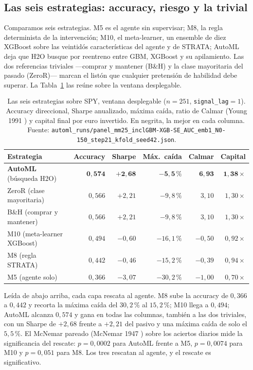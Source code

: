 \subsection{Las seis estrategias: accuracy, riesgo y la trivial}
\label{sec:mp-spy-estrategias}

Comparamos seis estrategias. M5 es el agente sin supervisar; M8, la regla determinista de la intervención; M10, el meta-learner, un ensemble de diez XGBoost sobre las veintidós características del agente y de STRATA; AutoML deja que H2O busque por reentreno entre GBM, XGBoost y su apilamiento. Las dos referencias triviales —comprar y mantener (B\&H) y la clase mayoritaria del pasado (ZeroR)— marcan el listón que cualquier pretensión de habilidad debe superar. La Tabla~\ref{tab:mp-spy} las reúne sobre la ventana desplegable.

\begin{table}[htbp]
\centering
\caption{Las seis estrategias sobre SPY, ventana desplegable ($n = 251$, \texttt{signal\_lag}${}=1$). Accuracy direccional, Sharpe anualizado, máxima caída, ratio de Calmar (Young 1991 \cite{young1991}) y capital final por euro invertido. En negrita, la mejor en cada columna. Fuente: \texttt{automl\_runs/panel\_mm25\_inclGBM-XGB-SE\_AUC\_emb1\_N0-150\_step21\_kfold\_seed42.json}.}
\label{tab:mp-spy}
\begin{tabular}{lrrrrr}
\toprule
Estrategia & Accuracy & Sharpe & Máx.\ caída & Calmar & Capital \\
\midrule
\textbf{AutoML} (búsqueda H2O) & $\mathbf{0{,}574}$ & $\mathbf{+2{,}68}$ & $\mathbf{-5{,}5\,\%}$ & $\mathbf{6{,}93}$ & $\mathbf{1{,}38\times}$ \\
ZeroR (clase mayoritaria) & $0{,}566$ & $+2{,}21$ & $-9{,}8\,\%$ & $3{,}10$ & $1{,}30\times$ \\
B\&H (comprar y mantener) & $0{,}566$ & $+2{,}21$ & $-9{,}8\,\%$ & $3{,}10$ & $1{,}30\times$ \\
M10 (meta-learner XGBoost) & $0{,}494$ & $-0{,}60$ & $-16{,}1\,\%$ & $-0{,}50$ & $0{,}92\times$ \\
M8 (regla STRATA) & $0{,}442$ & $-0{,}46$ & $-15{,}2\,\%$ & $-0{,}39$ & $0{,}94\times$ \\
M5 (agente solo) & $0{,}366$ & $-3{,}07$ & $-30{,}2\,\%$ & $-1{,}00$ & $0{,}70\times$ \\
\bottomrule
\end{tabular}
\end{table}

Leída de abajo arriba, cada capa rescata al agente. M8 sube la accuracy de $0{,}366$ a $0{,}442$ y recorta la máxima caída del $30{,}2\,\%$ al $15{,}2\,\%$; M10 llega a $0{,}494$; AutoML alcanza $0{,}574$ y gana en todas las columnas, también a las dos triviales, con un Sharpe de $+2{,}68$ frente a $+2{,}21$ del pasivo y una máxima caída de solo el $5{,}5\,\%$. El McNemar pareado (McNemar 1947 \cite{mcnemar1947}) sobre los aciertos diarios mide la significancia del rescate: $p = 0{,}0002$ para AutoML frente a M5, $p = 0{,}0074$ para M10 y $p = 0{,}051$ para M8. Los tres rescatan al agente, y el rescate es significativo.

